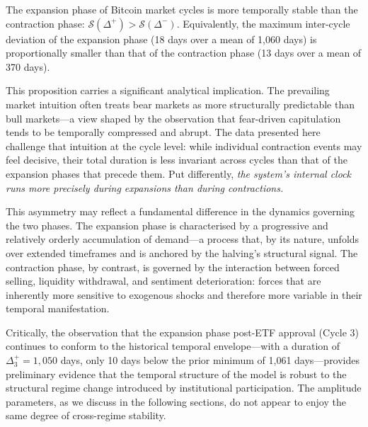 \begin{proposition}
  The expansion phase of Bitcoin market cycles is more temporally stable than
  the contraction phase: $\mathcal{S}(\Delta^{+}) > \mathcal{S}(\Delta^{-})$.
  Equivalently, the maximum inter-cycle deviation of the expansion phase
  (18 days over a mean of 1{,}060 days) is proportionally smaller than that of
  the contraction phase (13 days over a mean of 370 days).
\end{proposition}

This proposition carries a significant analytical implication. The prevailing
market intuition often treats bear markets as more structurally predictable
than bull markets---a view shaped by the observation that fear-driven
capitulation tends to be temporally compressed and abrupt. The data presented
here challenge that intuition at the cycle level: while individual contraction
events may feel decisive, their total duration is less invariant across cycles
than that of the expansion phases that precede them. Put differently,
\textit{the system's internal clock runs more precisely during expansions than
during contractions.}

This asymmetry may reflect a fundamental difference in the dynamics governing
the two phases. The expansion phase is characterised by a progressive and
relatively orderly accumulation of demand---a process that, by its nature,
unfolds over extended timeframes and is anchored by the halving's structural
signal. The contraction phase, by contrast, is governed by the interaction
between forced selling, liquidity withdrawal, and sentiment deterioration:
forces that are inherently more sensitive to exogenous shocks and therefore
more variable in their temporal manifestation.

Critically, the observation that the expansion phase post-ETF approval (Cycle 3)
continues to conform to the historical temporal envelope---with a duration of
$\Delta^{+}_3 = 1{,}050$ days, only 10 days below the prior minimum of
1{,}061 days---provides preliminary evidence that the temporal structure of
the model is robust to the structural regime change introduced by institutional
participation. The amplitude parameters, as we discuss in the following
sections, do not appear to enjoy the same degree of cross-regime stability.

